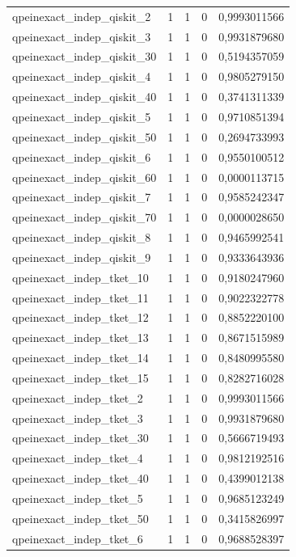 \begin{longtable}{lrrrr}
qpeinexact\_indep\_qiskit\_2 & 1 & 1 & 0 & 0,9993011566 \\
qpeinexact\_indep\_qiskit\_3 & 1 & 1 & 0 & 0,9931879680 \\
qpeinexact\_indep\_qiskit\_30 & 1 & 1 & 0 & 0,5194357059 \\
qpeinexact\_indep\_qiskit\_4 & 1 & 1 & 0 & 0,9805279150 \\
qpeinexact\_indep\_qiskit\_40 & 1 & 1 & 0 & 0,3741311339 \\
qpeinexact\_indep\_qiskit\_5 & 1 & 1 & 0 & 0,9710851394 \\
qpeinexact\_indep\_qiskit\_50 & 1 & 1 & 0 & 0,2694733993 \\
qpeinexact\_indep\_qiskit\_6 & 1 & 1 & 0 & 0,9550100512 \\
qpeinexact\_indep\_qiskit\_60 & 1 & 1 & 0 & 0,0000113715 \\
qpeinexact\_indep\_qiskit\_7 & 1 & 1 & 0 & 0,9585242347 \\
qpeinexact\_indep\_qiskit\_70 & 1 & 1 & 0 & 0,0000028650 \\
qpeinexact\_indep\_qiskit\_8 & 1 & 1 & 0 & 0,9465992541 \\
qpeinexact\_indep\_qiskit\_9 & 1 & 1 & 0 & 0,9333643936 \\
qpeinexact\_indep\_tket\_10 & 1 & 1 & 0 & 0,9180247960 \\
qpeinexact\_indep\_tket\_11 & 1 & 1 & 0 & 0,9022322778 \\
qpeinexact\_indep\_tket\_12 & 1 & 1 & 0 & 0,8852220100 \\
qpeinexact\_indep\_tket\_13 & 1 & 1 & 0 & 0,8671515989 \\
qpeinexact\_indep\_tket\_14 & 1 & 1 & 0 & 0,8480995580 \\
qpeinexact\_indep\_tket\_15 & 1 & 1 & 0 & 0,8282716028 \\
qpeinexact\_indep\_tket\_2 & 1 & 1 & 0 & 0,9993011566 \\
qpeinexact\_indep\_tket\_3 & 1 & 1 & 0 & 0,9931879680 \\
qpeinexact\_indep\_tket\_30 & 1 & 1 & 0 & 0,5666719493 \\
qpeinexact\_indep\_tket\_4 & 1 & 1 & 0 & 0,9812192516 \\
qpeinexact\_indep\_tket\_40 & 1 & 1 & 0 & 0,4399012138 \\
qpeinexact\_indep\_tket\_5 & 1 & 1 & 0 & 0,9685123249 \\
qpeinexact\_indep\_tket\_50 & 1 & 1 & 0 & 0,3415826997 \\
qpeinexact\_indep\_tket\_6 & 1 & 1 & 0 & 0,9688528397 \\

\end{longtable}

